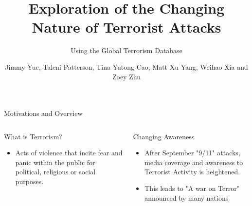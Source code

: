 \documentclass[10pt]{beamer}
\title{Exploration of the Changing Nature of Terrorist Attacks}
\subtitle{Using the Global Terrorism Database}
\date{}
\author{Jimmy Yue, Taleni Patterson,  Tina Yutong Cao, Matt  Xu Yang, Weihao Xia and  Zoey Zhu}
\institute{University of Sydney}
\begin{document}
\maketitle



\begin{frame}{Motivations and Overview}
    \begin{columns}[T,onlytextwidth]
     \begin{block}{What is Terrorism?}
     \begin{itemize}
         \item Acts of violence that incite fear and panic within the public for political, religious or social purposes.
     \end{itemize}
         
     \end{block}
    \begin{block}{Changing Awareness}
        \begin{itemize}
            \item After September "9/11" attacks, media coverage and awareness to Terrorist Activity is heightened.
            \item This leads to "A war on Terror" announced by many nations
        \end{itemize}
    \end{block}
     \end{columns}
\end{frame}
\end{document}
